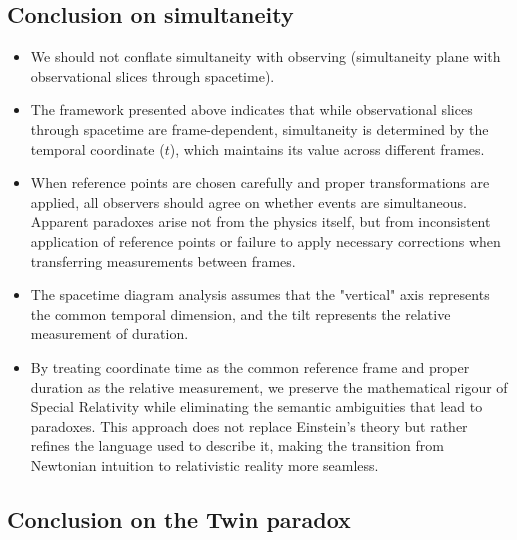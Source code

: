 \documentclass[pdflatex,sn-basic]{sn-jnl}
\theoremstyle{thmstyleone}%
\theoremstyle{thmstyletwo}%
\theoremstyle{thmstylethree}%
\begin{document}
	\subsection{Conclusion on simultaneity}\label{subsec6_1}
		\begin{itemize}
			\item We should not conflate simultaneity with observing (simultaneity plane with observational slices through spacetime). 
			\item The framework presented above indicates that while observational slices through spacetime are frame-dependent, simultaneity is determined by the temporal coordinate ($t$), which maintains its value across different frames.	
			\item When reference points are chosen carefully and proper transformations are applied, all observers should agree on whether events are simultaneous. Apparent paradoxes arise not from the physics itself, but from inconsistent application of reference points or failure to apply necessary corrections when transferring measurements between frames.
			\item The spacetime diagram analysis assumes that the "vertical" axis represents the common temporal dimension, and the tilt represents the relative measurement of duration.
			\item By treating coordinate time as the common reference frame and proper duration as the relative measurement, we preserve the mathematical rigour of Special Relativity while eliminating the semantic ambiguities that lead to paradoxes. This approach does not replace Einstein's theory but rather refines the language used to describe it, making the transition from Newtonian intuition to relativistic reality more seamless.
		\end{itemize}
	\subsection{Conclusion on the Twin paradox}\label{subsec6_2}
\end{document}
